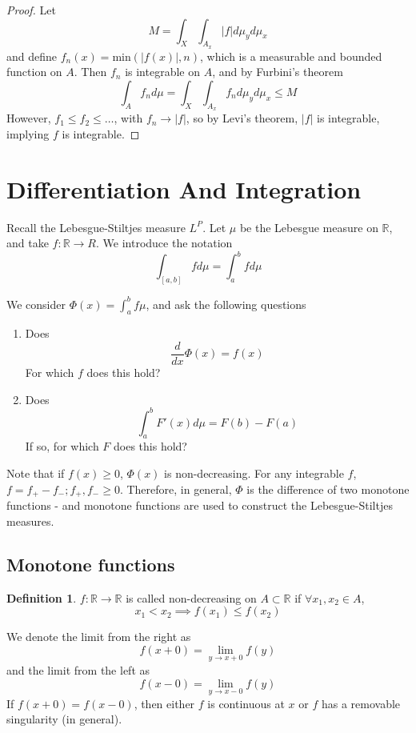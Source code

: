 \documentclass[11pt,a4paper]{report}
\theoremstyle{plain}
\theoremstyle{definition}
\newtheorem*{defn}{Definition}
\theoremstyle{remark}
\newcommand{\R}{\mathbb{R}}
\newcommand{\abs}[1]{\left| #1 \right|}
\begin{document}
\begin{proof}
  Let
  $$ M = \int_X \int_{A_x} \abs{f} d\mu_y d\mu_x $$
  and define $f_n(x) = \text{min}(\abs{f(x)}, n)$, which is a measurable and bounded function on $A$. Then $f_n$ is integrable on $A$, and by Furbini's theorem
  $$ \int_A f_n d\mu = \int_X \int_{A_x} f_n d\mu_y d\mu_x \le M $$
  However, $f_1 \le f_2 \le \dots$, with $f_n \rightarrow \abs{f}$, so by Levi's theorem, $\abs{f}$ is integrable, implying $f$ is integrable.
\end{proof}

\section{Differentiation And Integration}

Recall the Lebesgue-Stiltjes measure $L^P$. Let $\mu$ be the Lebesgue measure on $\R$, and take $f : \R \to R$. We introduce the notation
$$ \int_{[a, b]} f d\mu = \int_a^b f d\mu $$

We consider $\Phi(x) = \int_a^b f\mu $, and ask the following questions
\begin{enumerate}
  \item Does $$ \frac{d}{dx}\Phi(x) = f(x) $$
      For which $f$ does this hold?
  \item 
      Does
      $$ \int_a^b F'(x) d\mu = F(b) - F(a) $$
      If so, for which $F$ does this hold?
\end{enumerate}

Note that if $f(x) \ge 0$, $\Phi(x)$ is non-decreasing. For any integrable $f$, $f = f_{+} - f_{-}; f_{+}, f_{-} \ge 0$. Therefore, in general, $\Phi$ is the difference of two monotone functions - and monotone functions are used to construct the Lebesgue-Stiltjes measures.

\subsection{Monotone functions}

\begin{defn}
  $f : \R \to \R$ is called non-decreasing on $A \subset \R$ if $\forall x_1, x_2 \in A$,
    $$ x_1 < x_2 \implies f(x_1) \le f(x_2) $$
\end{defn}

We denote the limit from the right as
$$ f(x + 0) = \lim_{y \rightarrow x + 0} f(y) $$
and the limit from the left as
$$ f(x - 0) = \lim_{y \rightarrow x - 0} f(y) $$
If $f(x + 0) = f(x - 0)$, then either $f$ is continuous at $x$ or $f$ has a removable singularity (in general).
\end{document}
